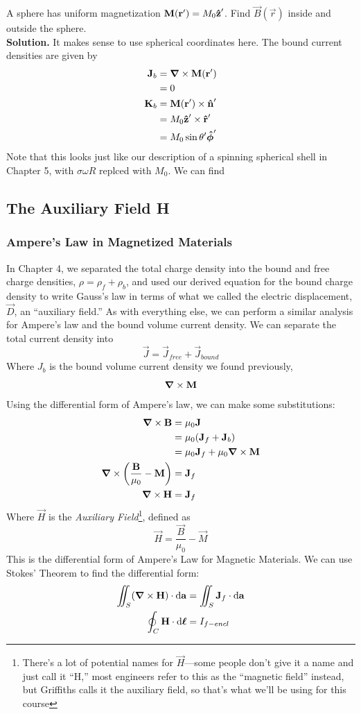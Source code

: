 \documentclass[a4paper]{article}
\begin{document}
\begin{eg}
	A sphere has uniform magnetization $\boldsymbol{\mathbf{M}}(\boldsymbol{\mathbf{r}}')=M_0\boldsymbol{\mathbf{\hat{z}}}'$. Find
	$\vec{B}(\vec{r})$ inside and outside the sphere.\\
	\textbf{Solution.} It makes sense to use spherical coordinates here.
	The bound current densities are given by
	\begin{align*}
		\boldsymbol{\mathbf{J}}_b &= \boldsymbol{\mathbf{\nabla}}\times\boldsymbol{\mathbf{M}}(\boldsymbol{\mathbf{r}}')\\
			  &= 0\\
		\boldsymbol{\mathbf{K}}_b &= \boldsymbol{\mathbf{M}}(\boldsymbol{\mathbf{r}}')\times\boldsymbol{\mathbf{\hat{n}}}'\\
			  &= M_0\boldsymbol{\mathbf{\hat{z}}}'\times\boldsymbol{\mathbf{\hat{r}}}'\\
			  &= M_0\sin\theta'\boldsymbol{\mathbf{\hat{\phi}}}'
	\end{align*}
	Note that this looks just like our description of a spinning
	spherical shell in Chapter 5, with $\sigma\omega R$ replced with
	$M_0$. We can find 
\end{eg}

\subsection{The Auxiliary Field \textbf{H}}
\subsubsection{Ampere's Law in Magnetized Materials}
In Chapter 4, we separated the total charge density into the bound and free
charge densities, $\rho = \rho_f+\rho_b$, and used our derived equation for
the bound charge density to write Gauss's law in terms of what we called the
electric displacement, $\vec{D}$, an ``auxiliary field.'' As with everything
else, we can perform a similar analysis for Ampere's law and the bound
volume current density. We can separate the total current density into
\[ \vec{J} = \vec{J}_{free}+\vec{J}_{bound} \]
Where $J_b$ is the bound volume current density we found previously,
\[ \boldsymbol{\mathbf{\nabla}}\times\boldsymbol{\mathbf{M}} \]
Using the differential form of Ampere's law, we can make some substitutions:
\begin{align*}
	\boldsymbol{\mathbf{\nabla}}\times\boldsymbol{\mathbf{B}} &= \mu_0\boldsymbol{\mathbf{J}}\\
			  &= \mu_0(\boldsymbol{\mathbf{J}}_f+\boldsymbol{\mathbf{J}}_b)\\
			  &= \mu_0\boldsymbol{\mathbf{J}}_f+\mu_0\boldsymbol{\mathbf{\nabla}}\times\boldsymbol{\mathbf{M}}\\
	\boldsymbol{\mathbf{\nabla}}\times\left(\frac{\boldsymbol{\mathbf{B}}}{\mu_0}-\boldsymbol{\mathbf{M}}\right) &=\boldsymbol{\mathbf{J}}_f\\
	\boldsymbol{\mathbf{\nabla}}\times\boldsymbol{\mathbf{H}} &= \boldsymbol{\mathbf{J}}_f
\end{align*}
Where $\vec{H}$ is the \emph{Auxiliary Field}\footnote{There's a lot of
potential names for $\vec{H}$---some people don't give it a name and just call
it ``H,'' most engineers refer to this as the ``magnetic field'' instead,
but Griffiths calls it the auxiliary field, so that's what we'll be using for
this course}, defined as
\[ \vec{H} = \frac{\vec{B}}{\mu_0}-\vec{M} \]
This is the differential form of Ampere's Law for Magnetic Materials.
We can use Stokes' Theorem to find the differential form:
\begin{align*}
\iint_S(\boldsymbol{\mathbf{\nabla}}\times\boldsymbol{\mathbf{H}})\cdot\mathrm{d}\boldsymbol{\mathbf{a}} &= \iint_S\boldsymbol{\mathbf{J}}_f\cdot\mathrm{d}\boldsymbol{\mathbf{a}}\\
\oint_C\boldsymbol{\mathbf{H}}\cdot\mathrm{d}\boldsymbol{\mathbf{\ell}} &= I_{f-encl}
\end{align*}
\end{document}
